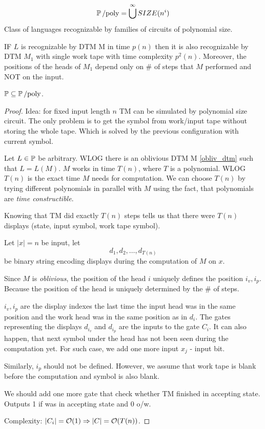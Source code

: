 \begin{definition}
	\[ \operatorname{\operatorname{\mathbb{P}}/poly} = \bigcup^{\infty} SIZE (n^i) \]
	Class of languages recognizable by families of circuits of polynomial size.
\end{definition}

\begin{reminder}\label{obliv_dtm}
	IF $L$ is recognizable by DTM M in time $p(n)$ then it is also recognizable by DTM $M_1$ with single work tape with time complexity $p^2(n)$.
	Moreover, the positions of the heads of $M_1$ depend only on \# of steps that $M$ performed and NOT on the input.
\end{reminder}

\begin{theorem}[$\TP \subseteq \Ppoly$]\label{tp_ppoly}
	$\TP \subseteq \Ppoly$.
\end{theorem}
\begin{proof}
	Idea: for fixed input length $n$ TM can be simulated by polynomial size circuit.
	The only problem is to get the symbol from work/input tape without storing the whole tape.
	Which is solved by the previous configuration with current symbol.

	Let $L \in \operatorname{\mathbb{P}}$ be arbitrary. WLOG there is an oblivious DTM M \cref{obliv_dtm} such that $L = L(M)$.
	$M$ works in time $T(n)$, where $T$ is a polynomial.
	WLOG $T(n)$ is the exact time $M$ needs for computation.
	We can choose $T(n)$ by trying different polynomials in parallel with $M$ using the fact, that polynomials are \emph{time constructible}.

	Knowing that TM did exactly $T(n)$ steps tells us that there were $T(n)$ displays (state, input symbol, work tape symbol).

	Let $|x| = n$ be input, let
	\[ d_1, d_2, \ldots, d_{T(n)} \]
	be binary string encoding displays during the computation of $M$ on $x$.

	Since $M$ is \emph{oblivious}, the position of the head $i$ uniquely defines the position $i_v, i_p$.
	Because the position of the head is uniquely determined by the \# of steps.

	$i_v, i_p$ are the display indexes the last time the input head was in the same position and the work head was in the same position as in $d_i$.
	The gates representing the displays $d_{i_v}$ and $d_{i_p}$ are the inputs to the gate $C_i$.
	It can also happen, that next symbol under the head has not been seen during the computation yet.
	For such case, we add one more input $x_j$ - input bit.

	Similarly, $i_p$ should not be defined.
	However, we assume that work tape is blank before the computation and symbol is also blank.

	We should add one more gate that check whether TM finished in accepting state.
	Outputs 1 if was in accepting state and 0 o/w.

	Complexity: $|C_i| = \mathcal{O}(1) \Rightarrow |C| = \mathcal{O}(T(n))$.
\end{proof}

